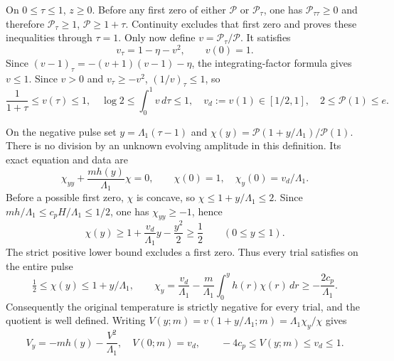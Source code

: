 On $0\leq\tau\leq1$, $z\geq0$. Before any first zero of either
$\mathcal P$ or $\mathcal P_\tau$, one has
$\mathcal P_{\tau\tau}\geq0$ and therefore
$\mathcal P_\tau\geq1$, $\mathcal P\geq1+\tau$.
Continuity excludes that first zero and proves these inequalities
through $\tau=1$. Only now define $v=\mathcal P_\tau/\mathcal P$.
It satisfies
\[
 v_\tau=1-\eta-v^2,\qquad v(0)=1.
\]
Since $(v-1)_\tau=-(v+1)(v-1)-\eta$, the integrating-factor formula
gives $v\leq1$. Since $v>0$ and $v_\tau\geq-v^2$,
$(1/v)_\tau\leq1$, so
\begin{equation}
 \frac1{1+\tau}\leq v(\tau)\leq1,\quad
 \log2\leq\int_0^1v\,d\tau\leq1,\quad
 v_d:=v(1)\in[1/2,1],\quad 2\leq\mathcal P(1)\leq e.
 \label{cvlane:eq:cv-first-ramp}
\end{equation}

On the negative pulse set $y=\Lambda_1(\tau-1)$ and
$\chi(y)=\mathcal P(1+y/\Lambda_1)/\mathcal P(1)$.
There is no division by an unknown evolving amplitude in this
definition. Its exact equation and data are
\begin{equation}
 \chi_{yy}+\frac{mh(y)}{\Lambda_1}\chi=0,\qquad
 \chi(0)=1,\quad\chi_y(0)=v_d/\Lambda_1.
 \label{cvlane:eq:cv-first-chi}
\end{equation}
Before a possible first zero, $\chi$ is concave, so
$\chi\leq1+y/\Lambda_1\leq2$. Since
$mh/\Lambda_1\leq c_pH/\Lambda_1\leq1/2$, one has
$\chi_{yy}\geq-1$, hence
\[
 \chi(y)\geq1+\frac{v_d}{\Lambda_1}y-\frac{y^2}{2}\geq\frac12
 \qquad(0\leq y\leq1).
\]
The strict positive lower bound excludes a first zero. Thus every
trial satisfies on the entire pulse
\begin{equation}
 \tfrac12\leq\chi(y)\leq1+y/\Lambda_1,\qquad
 \chi_y=\frac{v_d}{\Lambda_1}
  -\frac m{\Lambda_1}\int_0^yh(r)\chi(r)\,dr
  \geq-\frac{2c_p}{\Lambda_1}.
 \label{cvlane:eq:cv-first-trial-positive}
\end{equation}
Consequently the original temperature is strictly negative for every
trial, and the quotient is well defined. Writing
$V(y;m)=v(1+y/\Lambda_1;m)=\Lambda_1\chi_y/\chi$ gives
\begin{equation}
 V_y=-mh(y)-\frac{V^2}{\Lambda_1},\quad V(0;m)=v_d,
 \qquad -4c_p\leq V(y;m)\leq v_d\leq1.
 \label{cvlane:eq:cv-first-exact-riccati}
\end{equation}

